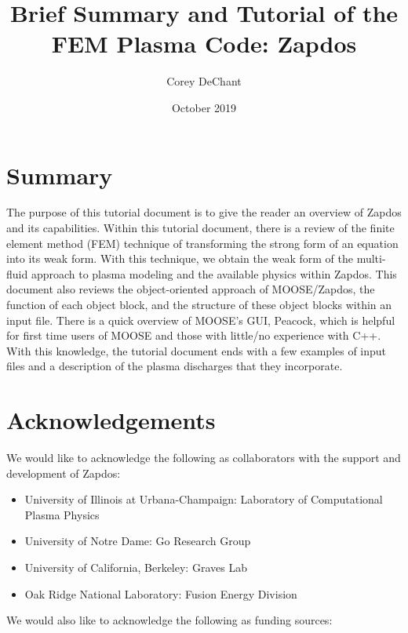 \documentclass[final]{report}
\begin{document}
  \title{Brief Summary and Tutorial of the FEM Plasma Code: Zapdos}
  \date{October 2019}
  \author{Corey DeChant}
  \maketitle

  \chapter*{Summary}
    The purpose of this tutorial document is to give the reader an overview of Zapdos and its capabilities. Within this tutorial document, there is a review of the finite element method (FEM) technique of transforming the strong form of an equation into its weak form. With this technique, we obtain the weak form of the multi-fluid approach to plasma modeling and the available physics within Zapdos. This document also reviews the object-oriented approach of MOOSE/Zapdos, the function of each object block, and the structure of these object blocks within an input file. There is a quick overview of MOOSE's GUI, Peacock, which is helpful for first time users of MOOSE and those with little/no experience with C++. With this knowledge, the tutorial document ends with a few examples of input files and a description of the plasma discharges that they incorporate.

  \chapter*{Acknowledgements}
    We would like to acknowledge the following as collaborators with the support and development of Zapdos:
    \begin{itemize}
        \item University of Illinois at Urbana-Champaign: Laboratory of Computational Plasma Physics
        \item University of Notre Dame: Go Research Group
        \item University of California, Berkeley: Graves Lab
        \item Oak Ridge National Laboratory: Fusion Energy Division
    \end{itemize}
    We would also like to acknowledge the following as funding sources:
\end{document}
